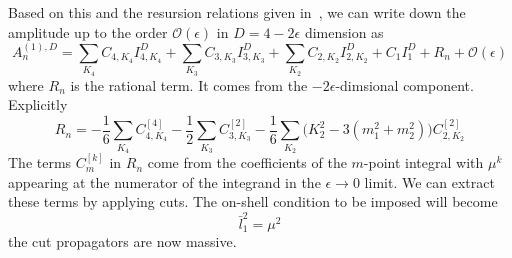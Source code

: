 Based on this and the resursion relations given in~\cite{Bern:1993kr}, we can write down the amplitude up to the order $\mathcal{O}(\epsilon)$ in $D = 4-2\epsilon$ dimension as
\begin{equation*}
A_n^{(1),D} = \sum_{K_4}C_{4,K_4} I_{4,K_4}^{D} +
\sum_{K_3}C_{3,K_3} I_{3,K_3}^{D}+
\sum_{K_2}C_{2,K_2} I_{2,K_2}^{D}+
C_1 I_1^{D} + R_n + \mathcal{O}(\epsilon)
\end{equation*}
where $R_n$ is the rational term. It comes from the $-2\epsilon$-dimsional component.
Explicitly
\begin{equation*}
R_n = -\frac{1}{6}\sum_{K_4}C_{4,K_4}^{[4]} - \frac{1}{2}\sum_{K_3}C_{3,K_3}^{[2]} - 
\frac{1}{6}\sum_{K_2}\big(K_2^2 - 3(m_1^2 + m_2^2)\big)C_{2,K_2}^{[2]}
\end{equation*}
The terms $C_m^[k]$ in $R_n$ come from the coefficients of the $m$-point integral with $\mu^k$ appearing at the numerator of the integrand in the $\epsilon\rightarrow 0 $ limit.
We can extract these terms by applying cuts. 
The on-shell condition to be imposed will become
\begin{equation*}
\bar{l}_1^2 = \mu^2
\end{equation*}
\ie the cut propagators are now massive.
%
%
